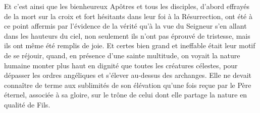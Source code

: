 Et c’est ainsi que les bienheureux Apôtres et tous les disciples,
	d’abord effrayés de la mort sur la croix
	et fort hésitants dans leur foi à la Résurrection,
	ont été à ce point affermis par l’évidence de la vérité
	qu’à la vue du Seigneur s’en allant dans les hauteurs du ciel,
	non seulement ils n’ont pas éprouvé de tristesse,
	mais ils ont même été remplis de joie.
Et certes bien grand et ineffable était leur motif de se réjouir,
	quand, en présence d’une sainte multitude,
	on voyait la nature humaine
		monter plus haut en dignité que toutes les créatures célestes,
	pour dépasser les ordres angéliques et s’élever au-dessus des archanges.
Elle ne devait connaître de terme aux sublimités de son élévation
	qu’une fois reçue par le Père éternel,
	associée à sa gloire,
	sur le trône de celui dont elle partage la nature en qualité de Fils.
